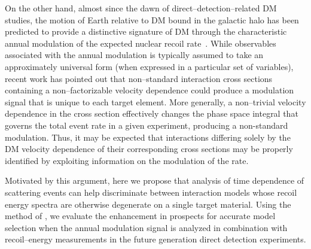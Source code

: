 \documentclass[11pt]{article}
\newcommand{\ie}{{\it i.e.~}}  \newcommand{\eg}{{\it e.g.~}}
\newcommand{\sjwColor}{red}
\newcommand{\sjw}[1]{{\color{\sjwColor} #1}}
\begin{document}
On the other hand, almost since the dawn of direct--detection--related DM studies, the motion of Earth relative to DM bound in the galactic halo has been predicted to provide a distinctive signature of DM through the characteristic annual modulation of the expected nuclear recoil rate~\cite{Freese:1987wu, Freese:2012xd,Lee:2013xxa,Britto:2014wga,DelNobile:2015nua,Kouvaris:2015xga}. While observables associated with the annual modulation is typically assumed to take an approximately universal form (when expressed in a particular set of variables), recent work \cite{DelNobile:2015tza,DelNobile:2015rmp} has pointed out that non--standard interaction cross sections containing a non--factorizable velocity dependence could produce a modulation signal that is unique to each target element. More generally, a non--trivial velocity dependence in the cross section effectively changes the phase space integral that governs the total event rate in a given experiment, producing a non-standard modulation. Thus, it may be expected that interactions differing solely by the DM velocity dependence of their corresponding cross sections may be properly identified by exploiting information on the modulation of the rate.


Motivated by this argument, here we propose that analysis of time dependence of scattering events can help discriminate between interaction models whose recoil energy spectra are otherwise degenerate on a single target material. Using the method of \cite{Gluscevic:2015sqa}, we evaluate the enhancement in prospects for accurate model selection when the annual modulation signal is analyzed in combination with recoil--energy measurements in the future generation direct detection experiments. 


\end{document}
